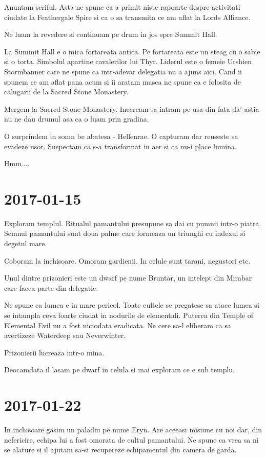\documentclass[12pt,oneside]{book}
\begin{document}
Anuntam seriful. Asta ne spune ca a primit niste rapoarte despre activitati ciudate
la Feathergale Spire si ca o sa transmita ce am aflat la Lords Alliance.

Ne luam la revedere si continuam pe drum in jos spre Summit Hall.

La Summit Hall e o mica fortareata antica. Pe fortareata este un steag cu o sabie si
o torta. Simbolul apartine cavalerilor lui Thyr. Liderul este o femeie Urshien 
Stormbanner care ne spune ca intr-adevar delegatia nu a ajuns aici. Cand ii spunem
ce am aflat pana acum si ii aratam masca ne spune ca e folosita de calugarii de la 
Sacred Stone Monastery.

Mergem la Sacred Stone Monastery. Incercam sa intram pe usa din fata da' astia
nu ne dau drumul asa ca o luam prin gradina.

O surprindem in somn be abatesa - Hellenrae. O capturam dar reuseste sa evadeze usor.
Suspectam ca s-a transformat in aer si ca nu-i place lumina. 

Hmm....

\section{2017-01-15}

Exploram templul. Ritualul pamantului presupune sa dai cu pumnii intr-o piatra.
Semnul pamantului sunt doua palme care formeaza un triunghi cu indexul si degetul
mare.

Coboram la inchisoare. Omoram gardienii. In celule sunt tarani, negustori etc.

Unul dintre prizonieri este un dwarf pe nume Bruntar, un intelept din Mirabar care
facea parte din delegatie. 

Ne spune ca lumea e in mare pericol. Toate cultele se pregatesc sa  atace lumea si 
se intampla ceva foarte ciudat in nodurile de  elementali. Puterea din Temple of 
Elemental Evil nu a fost niciodata eradicata. Ne cere sa-l eliberam ca sa avertizeze 
Waterdeep sau Neverwinter.

Prizonierii lucreaza intr-o mina.

Deocamdata il lasam pe dwarf in celula si mai exploram ce e sub templu.
	
\newpage

\section{2017-01-22}

In inchisoare gasim un paladin pe nume Eryn. Are aceeasi misiune cu noi dar, din nefericire, echipa lui a fost
omorata de cultul pamantului. Ne spune ca vrea sa ni se alature si il ajutam sa-si recupereze echipamentul din camera de garda.
\end{document}
